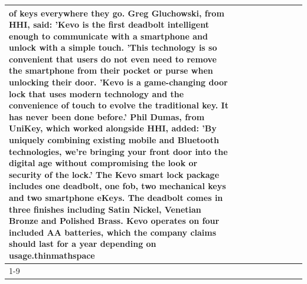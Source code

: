\begin{table}[H]
\begin{tabular}{lllrlllll}
of keys everywhere they go. Greg Gluchowski, from HHI, said: 'Kevo is the first deadbolt intelligent enough to communicate with a smartphone and unlock with a simple touch. 'This technology is so convenient that users do not even need to remove the smartphone from their pocket or purse when unlocking their door. 'Kevo is a game-changing door lock that uses modern technology and the convenience of touch to evolve the traditional key. It has never been done before.' Phil Dumas, from UniKey, which worked alongside HHI, added: 'By uniquely combining existing mobile and Bluetooth technologies, we’re bringing your front door into the digital age without compromising the look or security of the lock.' The Kevo smart lock package includes one deadbolt, one fob, two mechanical keys and two smartphone eKeys. The deadbolt comes in three finishes including Satin Nickel, Venetian Bronze and Polished Brass. Kevo operates on four included AA batteries, which the company claims should last for a year depending on usage.thinmathspace \\
\cline{1-9}

\end{tabular}
\end{table}
